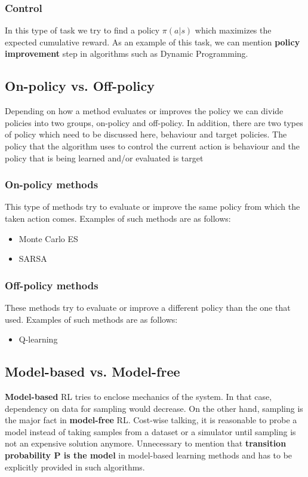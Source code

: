 \documentclass[letterpaper,12pt]{article}
\begin{document}
\subsubsection{Control}
In this type of task we try to find a policy $\pi(a|s)$ which maximizes the expected cumulative reward. As an example of this task, we can mention \textbf{policy improvement} step in algorithms such as Dynamic Programming.

\subsection{On-policy vs. Off-policy}
Depending on how a method evaluates or improves the policy we can divide policies into two groups, on-policy and off-policy. In addition, there are two types of policy which need to be discussed here, behaviour and target policies. The policy that the algorithm uses to control the current action is behaviour and the policy that is being learned and/or evaluated is target

\subsubsection{On-policy methods}
This type of methods try to evaluate or improve the same policy from which the taken action comes. Examples of such methods are as follows:
\begin{itemize}
    \item Monte Carlo ES
    \item SARSA
\end{itemize}

\subsubsection{Off-policy methods}
These methods try to evaluate or improve a different policy than the one that used. Examples of such methods are as follows:
\begin{itemize}
    \item Q-learning
\end{itemize}

\subsection{Model-based vs. Model-free}
\textbf{Model-based} RL tries to enclose mechanics of the system. In that case, dependency on data for sampling would decrease. On the other hand, sampling is the major fact in \textbf{model-free} RL. Cost-wise talking, it is reasonable to probe a model instead of taking samples from a dataset or a simulator until sampling is not an expensive solution anymore. Unnecessary to mention that \textbf{transition probability P is the model} in model-based learning methods and has to be explicitly provided in such algorithms.
\end{document}
